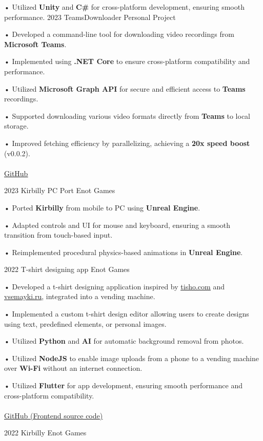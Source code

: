 \documentclass[9pt]{developercv} %
\begin{document}
\begin{entrylist}
{        • Utilized \textbf{Unity} and \textbf{C\#} for cross-platform development, ensuring smooth performance.
    }
    \entry
    {2023}
    {TeamsDownloader}
    {Personal Project}
    {

    • Developed a command-line tool for downloading video recordings from \textbf{Microsoft Teams}.

    • Implemented using \textbf{.NET Core} to ensure cross-platform compatibility and performance.

    • Utilized \textbf{Microsoft Graph API} for secure and efficient access to \textbf{Teams} recordings.

    • Supported downloading various video formats directly from \textbf{Teams} to local storage.

    • Improved fetching efficiency by parallelizing, achieving a \textbf{20x speed boost} (v0.0.2).
    \\
    \\
    {\href{https://www.github.com/ekrem-qb/TeamsDownloader}{\uline{GitHub}}}
    \\
    }
    \entry
    {2023}
    {Kirbilly PC Port}
    {Enot Games}
    {

        • Ported \textbf{Kirbilly} from mobile to PC using \textbf{Unreal Engine}.

        • Adapted controls and UI for mouse and keyboard, ensuring a smooth transition from touch-based input.

        • Reimplemented procedural physics-based animations in \textbf{Unreal Engine}.
        \\
    }
    \entry
    {2022}
    {T-shirt designing app}
    {Enot Games}
    {

        • Developed a t-shirt designing application inspired by \href{https://www.tisho.com}{\uline{tisho.com}} and \href{https://www.vsemayki.ru}{\uline{vsemayki.ru}}, integrated into a vending machine.

        • Implemented a custom t-shirt design editor allowing users to create designs using text, predefined elements, or personal images.

        • Utilized \textbf{Python} and \textbf{AI} for automatic background removal from photos.

        • Utilized \textbf{NodeJS} to enable image uploads from a phone to a vending machine over \textbf{Wi-Fi} without an internet connection.

        • Utilized \textbf{Flutter} for app development, ensuring smooth performance and cross-platform compatibility.
        \\
        \\
        \href{https://www.github.com/ekrem-qb/tshirt}{\uline{GitHub (Frontend source code)}}
        \\
    }
    \entry
    {2022}
    {Kirbilly}
    {Enot Games}
    {

}
\end{entrylist}
\end{document}
